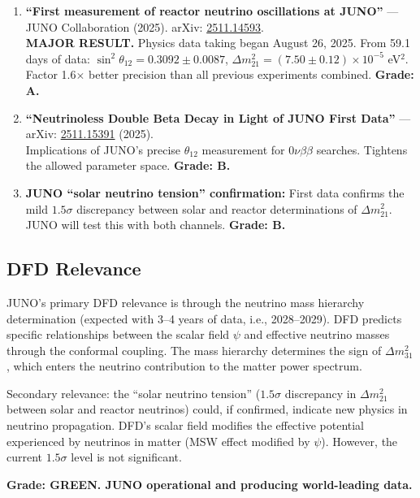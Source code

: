 \documentclass[11pt,a4paper]{article}
\begin{document}
\begin{enumerate}
\item \textbf{``First measurement of reactor neutrino oscillations at JUNO''} --- JUNO Collaboration (2025). arXiv: \href{https://arxiv.org/abs/2511.14593}{2511.14593}.\\
\textbf{MAJOR RESULT.} Physics data taking began August 26, 2025. From 59.1 days of data: $\sin^2\theta_{12} = 0.3092 \pm 0.0087$, $\Delta m^2_{21} = (7.50 \pm 0.12) \times 10^{-5}$ eV$^2$. Factor 1.6$\times$ better precision than all previous experiments combined. \textbf{Grade: A.}

\item \textbf{``Neutrinoless Double Beta Decay in Light of JUNO First Data''} --- arXiv: \href{https://arxiv.org/abs/2511.15391}{2511.15391} (2025).\\
Implications of JUNO's precise $\theta_{12}$ measurement for $0\nu\beta\beta$ searches. Tightens the allowed parameter space. \textbf{Grade: B.}

\item \textbf{JUNO ``solar neutrino tension'' confirmation:} First data confirms the mild $1.5\sigma$ discrepancy between solar and reactor determinations of $\Delta m^2_{21}$. JUNO will test this with both channels. \textbf{Grade: B.}
\end{enumerate}

\subsection{DFD Relevance}

JUNO's primary DFD relevance is through the neutrino mass hierarchy determination (expected with 3--4 years of data, i.e., 2028--2029). DFD predicts specific relationships between the scalar field $\psi$ and effective neutrino masses through the conformal coupling. The mass hierarchy determines the sign of $\Delta m^2_{31}$, which enters the neutrino contribution to the matter power spectrum.

Secondary relevance: the ``solar neutrino tension'' ($1.5\sigma$ discrepancy in $\Delta m^2_{21}$ between solar and reactor neutrinos) could, if confirmed, indicate new physics in neutrino propagation. DFD's scalar field modifies the effective potential experienced by neutrinos in matter (MSW effect modified by $\psi$). However, the current $1.5\sigma$ level is not significant.

\textbf{Grade: GREEN. JUNO operational and producing world-leading data.}
\end{document}
